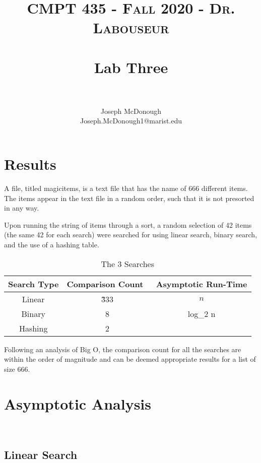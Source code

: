 \documentclass[letterpaper, 10pt,DIV=13]{scrartcl}
\title{	
   \normalfont \normalsize 
   \textsc{CMPT 435 - Fall 2020 - Dr. Labouseur} \\[10pt] %
   \horrule{0.5pt} \\[0.25cm] 	%
   \huge Lab Three  \\     	    %
   \horrule{0.5pt} \\[0.25cm] 	%
}
\author{Joseph McDonough \\ \normalsize Joseph.McDonough1@marist.edu}
\date{\normalize{October 30, 2020}}	%
\numberwithin{equation}{section} %
\numberwithin{figure}{section} %
\numberwithin{table}{section} %
\begin{document}
\maketitle %

\section{Results}
A file, titled magicitems, is a text file that has the name of 666 different items.  The items appear in the text file in a random order, such that it is not presorted in any way. 

Upon running the string of items through a sort, a random selection of 42 items (the same 42 for each search) were searched for using linear search, binary search, and the use of a hashing table.

\begin{table}[h!]
  \begin{center}
    \caption{The 3 Searches}
    \label{tab:table}
    \begin{tabular}{c|c|c}
      \textbf{Search Type} & \textbf{Comparison Count}\ & \textbf{Asymptotic Run-Time}\\
      \hline
      Linear & \~333 & $n$ \\
      Binary & 8 & log_2 n\\
      Hashing & 2 & \n 1 \\
    \end{tabular}
  \end{center}
\end{table}

Following an analysis of Big O, the comparison count for all the searches are within the order of magnitude and can be deemed appropriate results for a list of size 666.

\section{Asymptotic Analysis} \\

\subsection{Linear Search}
\end{document}
